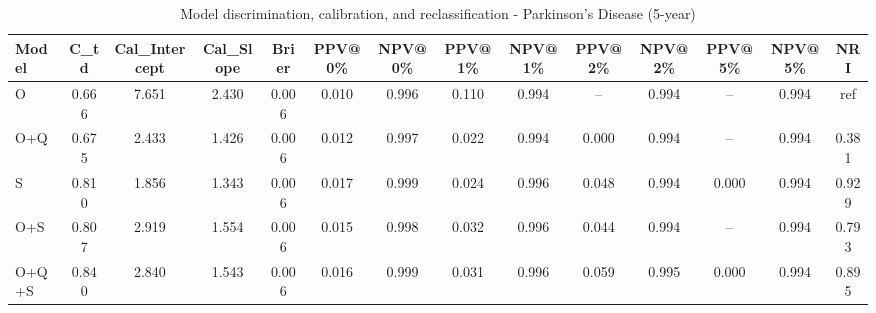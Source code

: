 \begin{table}[htbp]
\centering
\small
\caption{Model discrimination, calibration, and reclassification - Parkinson's Disease (5-year)}
\label{tab:perf_pd_5y}
\begin{tabular}{lccccccccccccc}
\toprule
Model & C\_td & Cal\_Intercept & Cal\_Slope & Brier & PPV@0\% & NPV@0\% & PPV@1\% & NPV@1\% & PPV@2\% & NPV@2\% & PPV@5\% & NPV@5\% & NRI \\
\midrule
O & 0.666 & 7.651 & 2.430 & 0.006 & 0.010 & 0.996 & 0.110 & 0.994 & -- & 0.994 & -- & 0.994 & ref \\
O+Q & 0.675 & 2.433 & 1.426 & 0.006 & 0.012 & 0.997 & 0.022 & 0.994 & 0.000 & 0.994 & -- & 0.994 & 0.381 \\
S & 0.810 & 1.856 & 1.343 & 0.006 & 0.017 & 0.999 & 0.024 & 0.996 & 0.048 & 0.994 & 0.000 & 0.994 & 0.929 \\
O+S & 0.807 & 2.919 & 1.554 & 0.006 & 0.015 & 0.998 & 0.032 & 0.996 & 0.044 & 0.994 & -- & 0.994 & 0.793 \\
O+Q+S & 0.840 & 2.840 & 1.543 & 0.006 & 0.016 & 0.999 & 0.031 & 0.996 & 0.059 & 0.995 & 0.000 & 0.994 & 0.895 \\
\bottomrule
\end{tabular}
\end{table}
